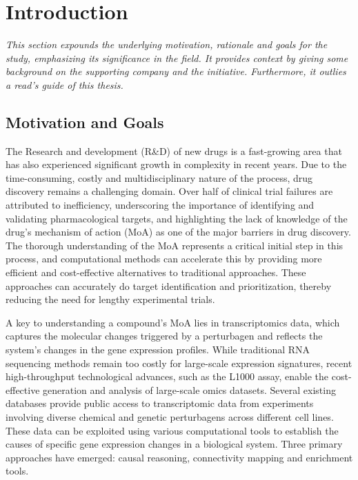 
%

\chapter{Introduction}
\label{cha:introduction}

\textit{This section expounds the underlying motivation, rationale and goals for the study, emphasizing its significance in the field. It provides context by giving some background on the supporting company and the initiative. Furthermore, it outlies a read’s guide of this thesis.}

\section{Motivation and Goals} %
\label{sec:motivation_and_goals}


The Research and development (R\&D) of new drugs is a fast-growing area that has also experienced significant growth in complexity in recent years. Due to the time-consuming, costly and multidisciplinary nature of the process, drug discovery remains a challenging domain. Over half of clinical trial failures are attributed to inefficiency, underscoring the importance of identifying and validating pharmacological targets, and highlighting the lack of knowledge of the drug’s mechanism of action (MoA) as one of the major barriers in drug discovery. The thorough understanding of the MoA represents a critical initial step in this process, and computational methods can accelerate this by providing more efficient and cost-effective alternatives to traditional approaches. These approaches can accurately do target identification and prioritization, thereby reducing the need for lengthy experimental trials.

A key to understanding a compound’s MoA lies in transcriptomics data, which captures the molecular changes triggered by a perturbagen and reflects the system’s changes in the gene expression profiles. While traditional RNA sequencing methods remain too costly for large-scale expression signatures, recent high-throughput technological advances, such as the L1000 assay, enable the cost-effective generation and analysis of large-scale omics datasets. Several existing databases provide public access to transcriptomic data from experiments involving diverse chemical and genetic perturbagens across different cell lines. These data can be exploited using various computational tools to establish the causes of specific gene expression changes in a biological system. Three primary approaches have emerged: causal reasoning, connectivity mapping and enrichment tools.

